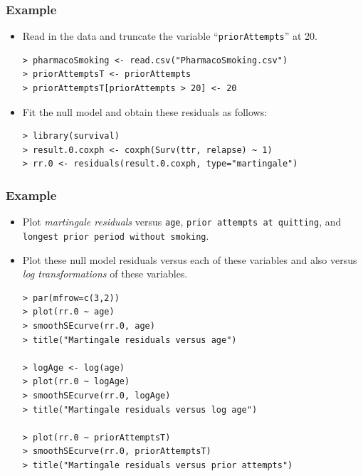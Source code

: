 \documentclass{beamer}
\newcommand{\empr}[1]{{\emph{\color{red}#1}}}
\begin{document}
\pagebreak
\begin{frame}[fragile]
\frametitle{Example}
\begin{itemize}
\begin{problock}{Example 7.1}
Consider the ``\texttt{pharmacoSmoking}'' dataset,and a fit of the ``\texttt{null}'' Cox proportional hazards model. A null model is one with no fitted covariates. plot Martingale Residuals against continuous predictors to get a preliminary assessment of which of these predictors should be in the model, and what form they should take
\end{problock}
\item Read in the data and truncate the variable ``\texttt{priorAttempts}'' at 20.
\begin{Verbatim}
> pharmacoSmoking <- read.csv("PharmacoSmoking.csv")
> priorAttemptsT <- priorAttempts
> priorAttemptsT[priorAttempts > 20] <- 20
\end{Verbatim}
\item Fit the null model and obtain these residuals as follows:
\begin{Verbatim}
> library(survival)
> result.0.coxph <- coxph(Surv(ttr, relapse) ~ 1)
> rr.0 <- residuals(result.0.coxph, type="martingale")
\end{Verbatim}
\end{itemize}
\end{frame}

\pagebreak
\begin{frame}[fragile]
\frametitle{Example}
\begin{itemize}
\item Plot \empr{martingale residuals} versus \texttt{age}, \texttt{prior attempts at quitting}, and \texttt{longest prior period without smoking}.
\item Plot these null model residuals versus each of these variables and also versus \empr{log transformations} of these variables.
\begin{Verbatim}
> par(mfrow=c(3,2))
> plot(rr.0 ~ age)
> smoothSEcurve(rr.0, age)
> title("Martingale residuals versus age")

> logAge <- log(age)
> plot(rr.0 ~ logAge)
> smoothSEcurve(rr.0, logAge)
> title("Martingale residuals versus log age")

> plot(rr.0 ~ priorAttemptsT)
> smoothSEcurve(rr.0, priorAttemptsT)
> title("Martingale residuals versus prior attempts")
\end{Verbatim}
\end{itemize}
\end{frame}
\end{document}
